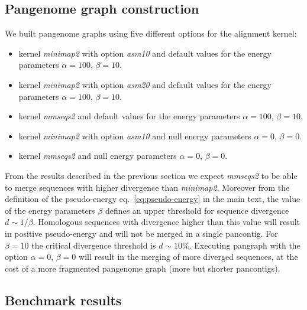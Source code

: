 \documentclass[aps,rmp,reprint,superscriptaddress,notitlepage,10pt,onecolumn]{revtex4-1}
\begin{document}
\subsection{Pangenome graph construction}

We built pangenome graphs using five different options for the alignment kernel:
\begin{itemize}
    \item kernel \textit{minimap2} with option \textit{asm10} and default values for the energy parameters $\alpha=100$, $\beta=10$.
    \item kernel \textit{minimap2} with option \textit{asm20} and default values for the energy parameters $\alpha=100$, $\beta=10$.
    \item kernel \textit{mmseqs2} and default values for the energy parameters $\alpha=100$, $\beta=10$.
    \item kernel \textit{minimap2} with option \textit{asm10} and null energy parameters $\alpha=0$, $\beta=0$.
    \item kernel \textit{mmseqs2} and null energy parameters $\alpha=0$, $\beta=0$.
\end{itemize}
From the results described in the previous section we expect \textit{mmseqs2} to be able to merge sequences with higher divergence than \textit{minimap2}. Moreover from the definition of the pseudo-energy eq.~\ref{eq:pseudo-energy} in the main text, the value of the energy parameters $\beta$ defines an upper threshold for sequence divergence $d \sim 1/\beta$. Homologous sequences with divergence higher than this value will result in positive pseudo-energy and will not be merged in a single pancontig. For $\beta=10$ the critical divergence threshold is $d \sim 10\%$. Executing pangraph with the option $\alpha=0$, $\beta=0$ will result in the merging of more diverged sequences, at the cost of a more fragmented pangenome graph (more but shorter pancontigs).


\subsection{Benchmark results}
\end{document}
